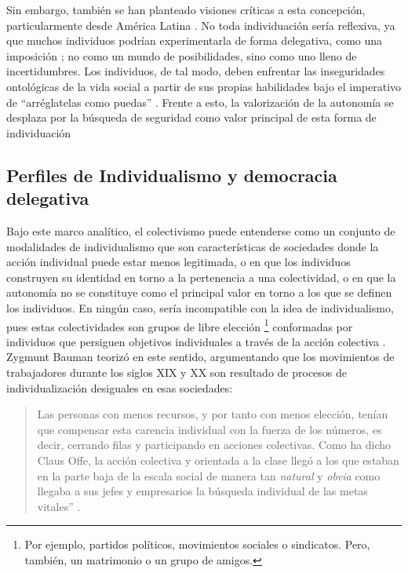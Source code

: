 \documentclass[12pt,twoside]{templates/facsothesis}
\begin{document}
Sin embargo, también se han planteado visiones críticas a esta concepción, particularmente desde América Latina \citep{araujo2012, robles2001}. No toda individuación sería reflexiva, ya que muchos individuos podrían experimentarla de forma delegativa, como una imposición \citep{silvapalacios2015}; no como un mundo de posibilidades, sino como uno lleno de incertidumbres. Los individuos, de tal modo, deben enfrentar las inseguridades ontológicas de la vida social a partir de sus propias habilidades bajo el imperativo de ``arréglatelas como puedas'' \citep{araujo2014, robles2001}. Frente a esto, la valorización de la autonomía se desplaza por la búsqueda de seguridad como valor principal de esta forma de individuación \citep{silvapalacios2015}

\hypertarget{perfiles-de-individualismo-y-democracia-delegativa}{%
\subsection*{Perfiles de Individualismo y democracia delegativa}\label{perfiles-de-individualismo-y-democracia-delegativa}}

Bajo este marco analítico, el colectivismo puede entenderse como un conjunto de modalidades de individualismo que son características de sociedades donde la acción individual puede estar menos legitimada, o en que los individuos construyen su identidad en torno a la pertenencia a una colectividad, o en que la autonomía no se constituye como el principal valor en torno a los que se definen los individuos. En ningún caso, sería incompatible con la idea de individualismo, pues estas colectividades son grupos de libre elección \footnote{Por ejemplo, partidos políticos, movimientos sociales o sindicatos. Pero, también, un matrimonio o un grupo de amigos.} conformadas por individuos que persiguen objetivos individuales a través de la acción colectiva \citep{arribas1999, moemeka1998}. Zygmunt Bauman teorizó en este sentido, argumentando que los movimientos de trabajadores durante los siglos XIX y XX son resultado de procesos de individualización desiguales en esas sociedades:

\begin{quote}
Las personas con menos recursos, y por tanto con menos elección, tenían que compensar esta carencia individual con la fuerza de los números, es decir, cerrando filas y participando en acciones colectivas. Como ha dicho Claus Offe, la acción colectiva y orientada a la clase llegó a los que estaban en la parte baja de la escala social de manera tan \emph{natural} y \emph{obvia} como llegaba a sus jefes y empresarios la búsqueda individual de las metas vitales'' \citep[p.~23]{bauman2003}.
\end{quote}
\end{document}
